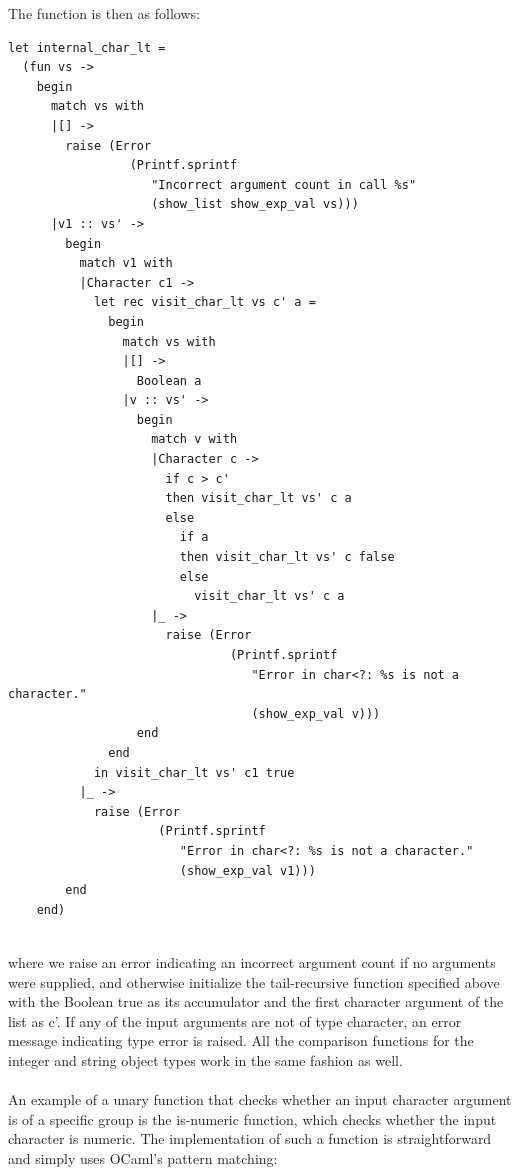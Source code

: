 The function is then as follows:
\begin{scriptsize}
\begin{verbatim}
let internal_char_lt =
  (fun vs ->
    begin
      match vs with
      |[] ->
        raise (Error
                 (Printf.sprintf
                    "Incorrect argument count in call %s"
                    (show_list show_exp_val vs)))
      |v1 :: vs' ->
        begin
          match v1 with
          |Character c1 ->
            let rec visit_char_lt vs c' a =
              begin
                match vs with
                |[] ->
                  Boolean a
                |v :: vs' ->
                  begin
                    match v with
                    |Character c ->
                      if c > c'
                      then visit_char_lt vs' c a
                      else
                        if a
                        then visit_char_lt vs' c false
                        else
                          visit_char_lt vs' c a
                    |_ ->
                      raise (Error
                               (Printf.sprintf
                                  "Error in char<?: %s is not a character."
                                  (show_exp_val v)))
                  end
              end
            in visit_char_lt vs' c1 true
          |_ ->
            raise (Error
                     (Printf.sprintf
                        "Error in char<?: %s is not a character."
                        (show_exp_val v1)))
        end
    end)
\end{verbatim}
\end{scriptsize}
\\
where we raise an error indicating an incorrect argument count if no arguments were supplied, and otherwise initialize the tail-recursive function specified above with the Boolean true as its accumulator and the first 
character argument of the list as c’. If any of the input arguments are not of type character, an error message indicating type error is raised. All the comparison functions for the integer and string object types 
work in the same fashion as well.
\\
\\
An example of a unary function that checks whether an input character argument is of a specific group is the is-numeric function, which checks whether the input character is numeric. The implementation of such a function is 
straightforward and simply uses OCaml’s pattern matching:
